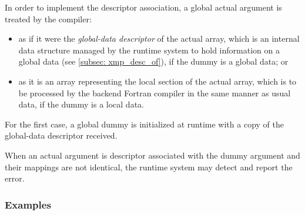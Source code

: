 In order to implement the descriptor association, a global actual
argument is treated by the {\XMP} compiler:

\begin{itemize}
 \item as if it were the {\it global-data descriptor} of the actual array, 
       which is an internal data structure managed by the {\XMP} runtime
       system to hold information on a global data (see \ref{subsec:
       xmp_desc_of}), if the dummy is a global data; or
 \item as it is an array representing the local section of the actual
       array, which is to be processed by the backend Fortran compiler
       in the same manner as usual data, if the dummy is a local data.
\end{itemize}

For the first case, a global dummy is initialized at runtime with a copy
of the global-data descriptor received.

When an actual argument is descriptor associated with the dummy argument
and their mappings are not identical, the {\XMP} runtime system may
detect and report the error.

\subsubsection*{Examples}

